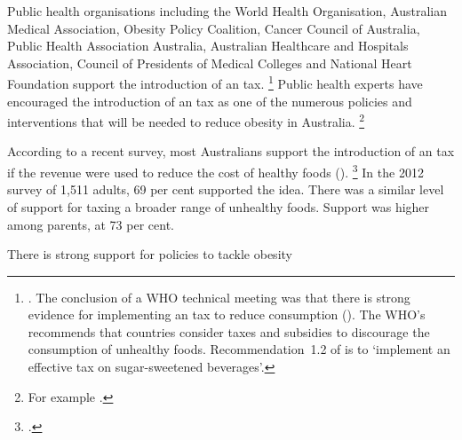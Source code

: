 \documentclass[embargoed]{grattan}
\begin{document}
Public health organisations including the World Health Organisation, Australian Medical Association, Obesity Policy Coalition, Cancer Council of Australia, Public Health Association Australia, Australian Healthcare and Hospitals Association, Council of Presidents of Medical Colleges and National Heart Foundation support the introduction of an \SSB{} tax.%
\footnote{\textcites{Coalition2016Policybriefcase}{Health2016Insufficientphysicalactivity}{Health2016Insufficientphysicalactivity}.
The conclusion of a WHO technical meeting was that there is strong evidence for implementing an \SSB{} tax to reduce consumption (\textcite{Organization2016FiscalPoliciesDiet}).
The WHO's  recommends that countries consider taxes and subsidies to discourage the consumption of unhealthy foods.
Recommendation~1.2 of \textcite{Organization2016Reportcommissionending}
is to `implement an effective tax on sugar-sweetened beverages'.} %
Public health experts have encouraged the introduction of an \SSB{} tax as one of the numerous policies and interventions that will be needed to reduce obesity in Australia.%
\footnote{For example \textcites{Brownell2009Ouncespreventionthepublic}{Veerman2016ImpactTaxSugar}{Sharma2014effectstaxingsugarsweetened}{NiMhurchu2014Twentypercenttax}{Kaplin2013Usingeconomicpolicy}{Long2015Costeffectivenesssugar}{Cawley2015IncidenceTaxesSugar}.}

According to a recent survey, most Australians support the introduction of an \SSB{} tax if the revenue were used to reduce the cost of healthy foods ().%
\footcite{Morley2012Publicopinionfood} In the 2012 survey of 1,511 adults, 69 per cent supported the idea.
There was a similar level of support for taxing a broader range of unhealthy foods.
Support was higher among parents, at 73 per cent. 

\begin{table}
\caption{There is strong support for policies to tackle obesity} \label{tbl:There-is-strong-support-for-policies-to-tackle-obesity}




\end{table}
\end{document}

